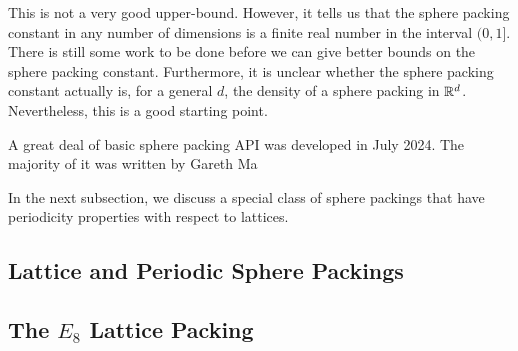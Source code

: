 This is not a very good upper-bound. However, it tells us that the sphere packing constant in any number of dimensions is a finite real number in the interval $(0, 1]$. There is still some work to be done before we can give better bounds on the sphere packing constant. Furthermore, it is unclear whether the sphere packing constant actually is, for a general $d$, the density of a sphere packing in $\mathbb{R}^d$. Nevertheless, this is a good starting point.

A great deal of basic sphere packing API was developed in July 2024. The majority of it was written by Gareth Ma

In the next subsection, we discuss a special class of sphere packings that have periodicity properties with respect to lattices.

\subsection{Lattice and Periodic Sphere Packings}

\subsection{The $E_8$ Lattice Packing}
